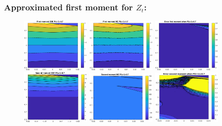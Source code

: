 \documentclass[aspectratio=169]{beamer}\usepackage[utf8]{inputenc}
\begin{document}
\begin{frame}\frametitle{Approximated first moment for $Z_t$:}

\begin{figure}[ht!]
\centering
\includegraphics[width=0.3\textwidth]{../../MATLAB_Files/Results/moments/lamperti/errors/fm_ODE_6.eps}\quad
\includegraphics[width=0.3\textwidth]{../../MATLAB_Files/Results/moments/lamperti/errors/fm_MC_6.eps}\quad
\includegraphics[width=0.3\textwidth]{../../MATLAB_Files/Results/moments/lamperti/errors/fm_6.eps}\quad
\includegraphics[width=0.3\textwidth]{../../MATLAB_Files/Results/moments/lamperti/errors/sm_ODE_6.eps}\quad
\includegraphics[width=0.3\textwidth]{../../MATLAB_Files/Results/moments/lamperti/errors/sm_MC_6.eps}\quad
\includegraphics[width=0.3\textwidth]{../../MATLAB_Files/Results/moments/lamperti/errors/sm_6.eps}
\end{figure}

\end{frame}
\end{document}
